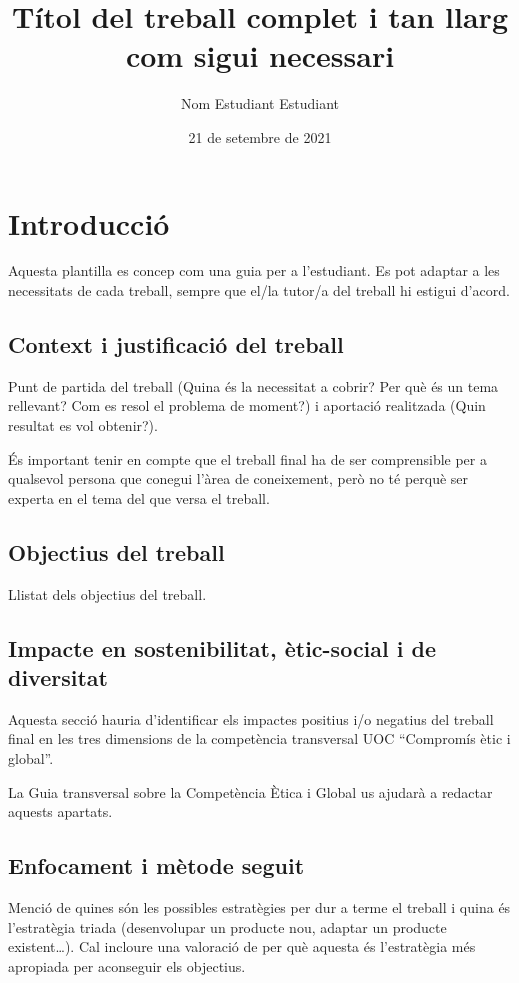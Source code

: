 \documentclass[CAT]{TFUOC}%
\title{Títol del treball complet i tan llarg com sigui necessari}
\author{Nom Estudiant Estudiant}
\date{21 de setembre de 2021}
\begin{document}
\estructura

\tableofcontents

\listoffigures

\listoftables




\chapter{Introducció}

Aquesta plantilla es concep com una guia per a l’estudiant. Es pot adaptar a les necessitats de cada treball, sempre que el/la tutor/a del treball hi estigui d’acord.

\section{Context i justificació del treball}


Punt de partida del treball (Quina és la necessitat a cobrir? Per què és un tema rellevant? Com es resol el problema de moment?) i aportació realitzada (Quin resultat es vol obtenir?).

És important tenir en compte que el treball final ha de ser comprensible per a qualsevol persona que conegui l'àrea de coneixement, però no té perquè ser experta en el tema del que versa el treball.

\section{Objectius del treball}

Llistat dels objectius del treball.

\section{Impacte en sostenibilitat, ètic-social i de diversitat}
\label{s:etic}

Aquesta secció hauria d'identificar els impactes positius i/o negatius del treball final en les tres dimensions de la competència transversal UOC “Compromís ètic i global”.
 
La Guia transversal sobre la Competència Ètica i Global us ajudarà a redactar aquests apartats.


\section{Enfocament i mètode seguit}

Menció de quines són les possibles estratègies per dur a terme el treball i quina és l’estratègia triada (desenvolupar un producte nou, adaptar un producte existent…). Cal incloure una valoració de per què aquesta és l’estratègia més apropiada per aconseguir els objectius.   	
\end{document}
